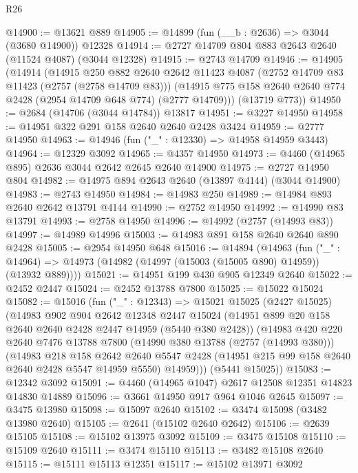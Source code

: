\begin{lexlean}{R26}
\begin{coremodule}
@14900 := @13621 @889
@14905 := @14899 (fun (__b : @2636) => @3044 (@3680 @14900)) @12328
@14914 := @2727 @14709 @804 @883 @2643 @2640 (@11524 @4087) (@3044 @12328)
@14915 := @2743 @14709
@14946 := @14905
    (@14914
      (@14915
        @250
        @882
        @2640
        @2642
        @11423
        @4087
        (@2752 @14709 @83 @11423 (@2757 (@2758 @14709 @83)))
        (@14915 @775 @158 @2640 @2640 @774 @2428 (@2954 @14709 @648 @774) (@2777 @14709)))
      (@13719 @773))
@14950 := @2684 (@14706 (@3044 @14784)) @13817
@14951 := @3227 @14950
@14958 := @14951 @322 @291 @158 @2640 @2640 @2428 @3424
@14959 := @2777 @14950
@14963 := @14946 (fun ("_" : @12330) => @14958 @14959 @3443)
@14964 := @12329 @3092
@14965 := @4357 @14950
@14973 := @4460 (@14965 @895) @2636 @3044 @2642 @2645 @2640 @14900
@14975 := @2727 @14950 @804
@14982 := @14975 @894 @2643 @2640 (@13897 @4144) (@3044 @14900)
@14983 := @2743 @14950
@14984 := @14983 @250
@14989 := @14984 @893 @2640 @2642 @13791 @4144
@14990 := @2752 @14950
@14992 := @14990 @83 @13791
@14993 := @2758 @14950
@14996 := @14992 (@2757 (@14993 @83))
@14997 := @14989 @14996
@15003 := @14983 @891 @158 @2640 @2640 @890 @2428
@15005 := @2954 @14950 @648
@15016 := @14894
    (@14963
      (fun ("_" : @14964) => @14973 (@14982 (@14997 (@15003 (@15005 @890) @14959)) (@13932 @889))))
@15021 := @14951 @199 @430 @905 @12349 @2640
@15022 := @2452 @2447
@15024 := @2452 @13788 @7800
@15025 := @15022 @15024
@15082 := @15016
    (fun ("_" : @12343) =>
    @15021
      @15025
      (@2427 @15025)
      (@14983
        @902
        @904
        @2642
        @12348
        @2447
        @15024
        (@14951 @899 @20 @158 @2640 @2640 @2428 @2447 @14959 (@5440 @380 @2428))
        (@14983
          @420
          @220
          @2640
          @7476
          @13788
          @7800
          (@14990 @380 @13788 (@2757 (@14993 @380)))
          (@14983
            @218
            @158
            @2642
            @2640
            @5547
            @2428
            (@14951 @215 @99 @158 @2640 @2640 @2428 @5547 @14959 @5550)
            @14959)))
      (@5441 @15025))
@15083 := @12342 @3092
@15091 := @4460 (@14965 @1047) @2617 @12508 @12351 @14823 @14830 @14889
@15096 := @3661 @14950 @917 @964 @1046 @2645
@15097 := @3475 @13980
@15098 := @15097 @2640
@15102 := @3474 @15098 (@3482 @13980 @2640)
@15105 := @2641 (@15102 @2640 @2642)
@15106 := @2639 @15105
@15108 := @15102 @13975 @3092
@15109 := @3475 @15108
@15110 := @15109 @2640
@15111 := @3474 @15110
@15113 := @3482 @15108 @2640
@15115 := @15111 @15113 @12351
@15117 := @15102 @13971 @3092

\end{coremodule}
\end{lexlean}
